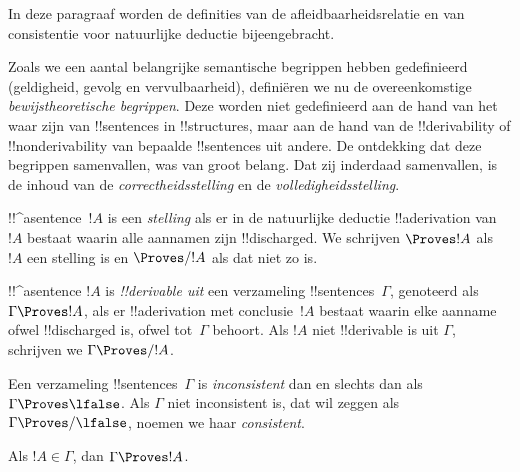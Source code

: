 \documentclass[../../../include/open-logic-section]{subfiles}
\begin{document}
      {}
      {}


\begin{editorial}
In deze paragraaf worden de definities van de afleidbaarheidsrelatie
en van consistentie voor natuurlijke deductie bijeengebracht.
\end{editorial}

\begin{explain}
Zoals we een aantal belangrijke semantische begrippen hebben
gedefinieerd (geldigheid, gevolg en vervulbaarheid), definiëren we nu
de overeenkomstige \emph{bewijstheoretische begrippen}. Deze worden
niet gedefinieerd aan de hand van het waar zijn van !!{sentence}s in
!!{structure}s, maar aan de hand van de !!{derivability} of
!!{nonderivability} van bepaalde !!{sentence}s uit andere. De
ontdekking dat deze begrippen samenvallen, was van groot belang. Dat
zij inderdaad samenvallen, is de inhoud van de
\emph{correctheidsstelling} en de \emph{volledigheidsstelling}.
\end{explain}


\begin{defn}[Stellingen]
!!^a{sentence}~$!A$ is een \emph{stelling} als er in de natuurlijke
deductie !!a{derivation} van~$!A$ bestaat waarin alle aannamen zijn
!!{discharged}. We schrijven $\Proves !A$ als $!A$ een stelling is en
$\Proves/ !A$ als dat niet zo is.
\end{defn}

\begin{defn}[!!^{derivability}]
!!^a{sentence} $!A$ is \emph{!!{derivable} uit} een verzameling
!!{sentence}s~$\Gamma$, genoteerd als $\Gamma \Proves !A$, als er
!!a{derivation} met conclusie~$!A$ bestaat waarin elke aanname ofwel
!!{discharged} is, ofwel tot~$\Gamma$ behoort. Als $!A$ niet
!!{derivable} is uit $\Gamma$, schrijven we $\Gamma \Proves/ !A$.
\end{defn}

\begin{defn}[Consistentie]
Een verzameling !!{sentence}s~$\Gamma$ is \emph{inconsistent} dan en
slechts dan als $\Gamma \Proves \lfalse$. Als $\Gamma$ niet
inconsistent is, dat wil zeggen als $\Gamma \Proves/ \lfalse$, noemen
we haar \emph{consistent}.
\end{defn}

\begin{prop}[Reflexiviteit]
Als $!A \in \Gamma$, dan $\Gamma \Proves !A$.
\end{prop}
\end{document}
